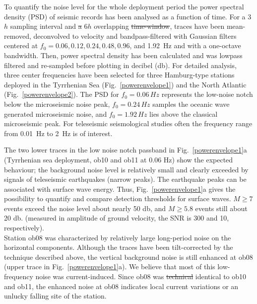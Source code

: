 \documentclass{article}
\providecommand{\remark}[1]{{\typeout{REMARK (p.\arabic{page}): #1}[\bf #1]}} %
\providecommand{\DIFadd}[1]{{\protect\color{blue}\uwave{#1}}} %
\providecommand{\DIFdel}[1]{{\protect\color{red}\sout{#1}}}                      %
\providecommand{\DIFaddbegin}{} %
\providecommand{\DIFaddend}{} %
\providecommand{\DIFdelbegin}{} %
\providecommand{\DIFdelend}{} %
\begin{document}
{%
To quantify the noise level for the whole deployment period
the power spectral density (PSD) of seismic records has been analysed
as a function of time.
For a 3$h$ sampling interval and \DIFdelbegin \DIFdel{a }\DIFdelend 6$h$ overlapping \DIFdelbegin \DIFdel{time-window}\DIFdelend \DIFaddbegin \DIFadd{time-windows}\DIFaddend ,
traces have been mean-removed, deconvolved to velocity 
and bandpass-filtered 
with Gaussian filters centered at $f_0=0.06, 0.12, 0.24, 0.48,
0.96$, and 1.92~Hz
and with  a one-octave bandwidth.
Then, power spectral  density has been calculated and  was 
lowpass filtered and re-sampled before plotting 
in decibel (db).
For detailed analysis, three 
center frequencies have been selected for three Hamburg-type stations deployed in 
the 
Tyrrhenian Sea (Fig.~\ref{powerenvelope1})
and the
North Atlantic (Fig.~\ref{powerenvelope2}).
The PSD for $f_0 = 0.06\, Hz$ represents the low-noise notch
below the microseismic noise peak, 
$f_0 = 0.24\, Hz$ samples the oceanic wave generated microseismic noise, 
and 
$f_0 = 1.92\, Hz$ lies above the classical microseismic peak.
For teleseismic seismological studies often 
the frequency range 
from 0.01~Hz to 2~Hz is of interest.

The two lower traces in the low noise notch passband 
in Fig.~\ref{powerenvelope1}a (Tyrrhenian sea deployment, 
ob10 and ob11 at $0.06$ Hz)
show the expected behaviour; 
the background noise level is relatively small and clearly exceeded
by signals of teleseismic earthquakes (narrow peaks). 
The earthquake peaks can be associated with surface wave energy.
Thus,  Fig.~\ref{powerenvelope1}a gives 
the possibility to quantify and compare detection 
thresholds for surface waves. 
$M \geq 7$ events exceed the noise level about nearly 50 db, 
and 
$M \geq 5.8$ events still about 20 db.
\DIFdelbegin %
\DIFdelend (measured in amplitude of ground velocity, the SNR is 
300 and 10, respectively). 
\\
Station ob08
was characterized by relatively large long-period noise on the 
horizontal components. 
Although the traces have been tilt-corrected by the technique described 
above, the vertical background noise is still enhanced at ob08
(upper trace in Fig.~\ref{powerenvelope1}a).
We believe that most of this low-frequency noise was current-induced.
Since ob08 was 
\DIFdelbegin \DIFdel{technical }\DIFdelend \DIFaddbegin \DIFadd{technically }\DIFaddend identical to ob10 and ob11, 
the enhanced noise at ob08 
indicates local current variations 
or an unlucky falling site of the station.

}
\end{document}
